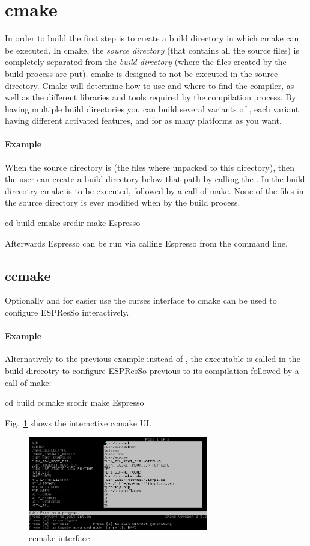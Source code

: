 \section{cmake}
In order to build \es the first step is to create a build directory in which cmake can be executed. In cmake, the \emph{source directory} (that contains all the source
files) is completely separated from the \emph{build directory} (where the files created by the build process are put). cmake is designed to not be executed in the source directory.
Cmake will determine how to use and where to find
the compiler, as well as the different libraries and tools required by
the compilation process. By having multiple build directories you can build several
variants of \es, each variant having different activated features, and
for as many platforms as you want.

\paragraph{Example}
When the source directory is  (\ie the files where
unpacked to this directory), then the user can create a build directory
 below that path by calling the . In the build direcotry cmake is to be executed, followed by a call of make. None of the files in the source directory is ever modified when by the build process.
\begin{code}
cd build
cmake srcdir
make
Espresso
\end{code}
Afterwards Espresso can be run via calling Espresso from the command line.
\subsection{ccmake}
Optionally and for easier use the curses interface to cmake can be used to configure ESPResSo interactively. 
\paragraph{Example}
Alternatively to the previous example instead of , the  executable is called in the build direcotry to configure ESPResSo previous to its compilation followed by a call of make:
\begin{code}
cd build
ccmake srcdir
make
Espresso
\end{code}
Fig.~\ref{fig:ccmake} shows the interactive ccmake UI.
\begin{figure}[tb]
  \centering
  \includegraphics[width=0.7\textwidth]{figures/ccmake-example.png}
  \caption{ccmake interface}
  \label{fig:ccmake}
\end{figure}


